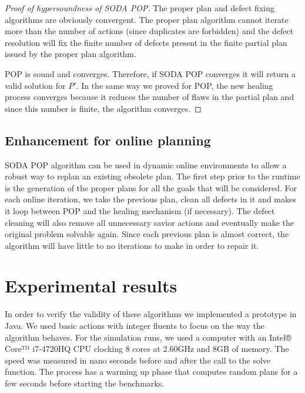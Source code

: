\documentclass[]{article}
\begin{document}
\begin{proof}[Proof of hypersoundness of SODA POP]

The proper plan and defect fixing algorithms are obviously convergent.
The proper plan algorithm cannot iterate more than the number of actions
(since duplicates are forbidden) and the defect resolution will fix the
finite number of defects present in the finite partial plan issued by
the proper plan algorithm.

POP is sound and converges. Therefore, if SODA POP converges it will
return a valid solution for \(P'\). In the same way we proved for POP,
the new healing process converges because it reduces the number of flaws
in the partial plan and since this number is finite, the algorithm
converges.\qedhere

\end{proof}

\subsection{Enhancement for online
planning}\label{enhancement-for-online-planning}

SODA POP algorithm can be used in dynamic online environments to allow a
robust way to replan an existing obsolete plan. The first step prior to
the runtime is the generation of the proper plans for all the goals that
will be considered. For each online iteration, we take the previous
plan, clean all defects in it and makes it loop between POP and the
healing mechanism (if necessary). The defect cleaning will also remove
all unnecessary savior actions and eventually make the original problem
solvable again. Since each previous plan is almost correct, the
algorithm will have little to no iterations to make in order to repair
it.

\section{Experimental results}\label{experimental-results}

In order to verify the validity of these algorithms we implemented a
prototype in Java. We used basic actions with integer fluents to focus
on the way the algorithm behaves. For the simulation runs, we used a
computer with an Intel® Core™ i7-4720HQ CPU clocking 8 cores at 2.60GHz
and 8GB of memory. The speed was measured in nano seconds before and
after the call to the solve function. The process has a warming up phase
that computes random plans for a few seconds before starting the
benchmarks.
\end{document}
